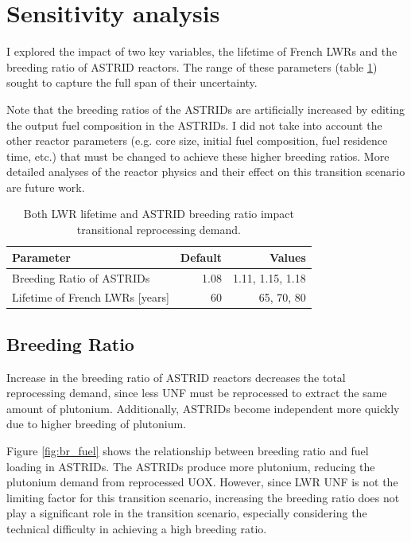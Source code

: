 \section{Sensitivity analysis}

I explored the impact of two key variables, the lifetime of French
\glspl{LWR} and the breeding ratio of \gls{ASTRID} reactors. The range
of these parameters (table \ref{tab:sen_par}) sought to capture the full
span of their uncertainty.

Note that the breeding ratios of the \glspl{ASTRID} are artificially increased
by editing the output fuel composition in the \glspl{ASTRID}. I did not 
take into account the other reactor parameters (e.g. core size, initial
fuel composition, fuel residence time, etc.)
that must be changed to achieve these higher breeding ratios. More detailed analyses
of the reactor physics and their effect on this transition scenario are future work.

\begin{table}[h]
    \centering
    \caption{Both \gls{LWR} lifetime and \gls{ASTRID} breeding ratio impact 
    transitional reprocessing demand.}
    \begin{tabularx}{0.8\textwidth}{lrr}
        \hline
        \textbf{Parameter} & \textbf{Default} & \textbf{Values} \\
        \hline
        Breeding Ratio of \glspl{ASTRID} & 1.08 & 1.11, 1.15, 1.18 \\ 
        Lifetime of French \glspl{LWR} [years] & 60  & 65, 70, 80 \\
        \hline
    \end{tabularx}
    \label{tab:sen_par}
\end{table}

\subsection{Breeding Ratio}


Increase in the breeding ratio of \gls{ASTRID} reactors
decreases the total reprocessing demand, since less
\gls{UNF} must be reprocessed to extract the same amount of
plutonium. Additionally,
\glspl{ASTRID} become independent more quickly due to
higher breeding of plutonium.

Figure \ref{fig:br_fuel} shows the relationship between breeding ratio and fuel loading in \glspl{ASTRID}.
The \glspl{ASTRID} produce 
more plutonium, reducing the plutonium demand from 
reprocessed \gls{UOX}. However, since \gls{LWR} \gls{UNF} is not
the limiting factor for this transition scenario,
increasing the breeding ratio does not play a significant
role in the transition scenario, especially considering the technical difficulty
in achieving a high breeding ratio.

